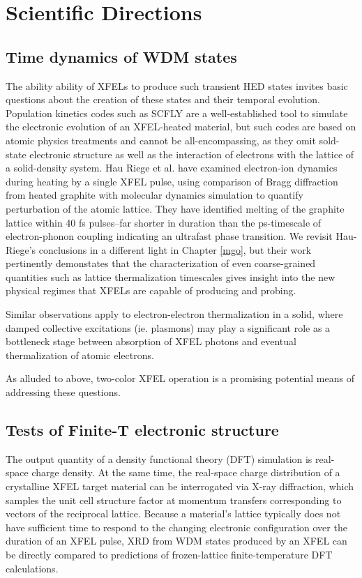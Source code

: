 \documentclass [11pt, proquest, article] {uwthesis}[2016/11/22]
\begin{document}
\section{Scientific Directions}
\subsection{Time dynamics of WDM states}
The ability ability of XFELs to produce such transient HED states invites basic questions about the creation of these states and their temporal evolution. Population kinetics codes such as SCFLY are a well-established tool to simulate the electronic evolution of an XFEL-heated material, but such codes are based on atomic physics treatments and cannot be all-encompassing, as they omit sold-state electronic structure as well as the interaction of electrons with the lattice of a solid-density system.  Hau Riege et al. have examined electron-ion dynamics during heating by a single XFEL pulse, using comparison of Bragg diffraction from heated graphite with molecular dynamics simulation to quantify perturbation of the atomic lattice. They have identified melting of the graphite lattice within 40 fs pulses--far shorter in duration than the ps-timescale of electron-phonon coupling indicating an ultrafast phase transition. We revisit Hau-Riege's conclusions in a different light in Chapter \ref{mgo}, but their work pertinently demonstates that the characterization of even coarse-grained quantities such as lattice thermalization timescales gives insight into the new physical regimes that XFELs are capable of producing and probing. 

Similar observations apply to electron-electron thermalization in a solid, where damped collective excitations (ie. plasmons) may play a significant role as a bottleneck stage between absorption of XFEL photons and eventual thermalization of atomic electrons.\cite{egerton1979k, sorini2006ab}%

As alluded to above, two-color XFEL operation is a promising potential means of addressing these questions. 

\subsection{Tests of Finite-T electronic structure}
\label{finite_t_theory}
The output quantity of a density functional theory (DFT) simulation is real-space charge density. At the same time, the real-space charge distribution of a crystalline XFEL target material can be interrogated via X-ray diffraction, which samples the unit cell structure factor at momentum transfers corresponding to vectors of the reciprocal lattice. Because a material's lattice typically does not have sufficient time to respond to the changing electronic configuration over the duration of an XFEL pulse, XRD from WDM states produced by an XFEL can be directly compared to predictions of frozen-lattice finite-temperature DFT calculations.
\end{document}

